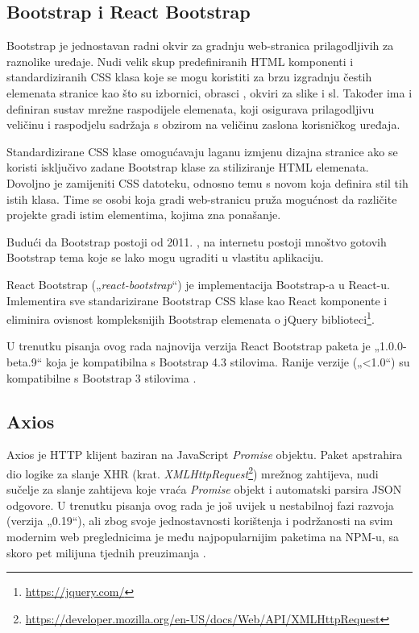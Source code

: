\documentclass[times, utf8, diplomski, numeric]{fer}
\newcommand{\razmakp}{\vspace{18pt}}
\newcommand{\razmaks}{\vspace{10pt}}
\begin{document}
\newpage
\subsection{Bootstrap i React Bootstrap}

Bootstrap je jednostavan radni okvir za gradnju web-stranica prilagodljivih za raznolike uređaje.
Nudi velik skup predefiniranih HTML komponenti i standardiziranih CSS klasa koje se mogu koristiti za brzu izgradnju čestih elemenata stranice kao što su izbornici, obrasci , okviri za slike i sl.
Također ima i definiran sustav mrežne raspodijele elemenata, koji osigurava prilagodljivu veličinu i raspodjelu sadržaja s obzirom na veličinu zaslona korisničkog uređaja.

Standardizirane CSS klase omogućavaju laganu izmjenu dizajna stranice ako se koristi isključivo zadane Bootstrap klase za stiliziranje HTML elemenata.
Dovoljno je zamijeniti CSS datoteku, odnosno temu s novom koja definira stil tih istih klasa.
Time se osobi koja gradi web-stranicu pruža mogućnost da različite projekte gradi istim elementima, kojima zna ponašanje.

Budući da Bootstrap postoji od 2011. \citep{wiki_bs}, na internetu postoji mnoštvo gotovih Bootstrap tema koje se lako mogu ugraditi u vlastitu aplikaciju.

\razmakp

React Bootstrap („\emph{react-bootstrap}“) je implementacija Bootstrap-a u React-u.
Imlementira sve standarizirane Bootstrap CSS klase kao React komponente i eliminira ovisnost kompleksnijih Bootstrap elemenata o jQuery biblioteci\footnote{\url{https://jquery.com/}}.

U trenutku pisanja ovog rada najnovija verzija React Bootstrap paketa je „1.0.0-beta.9“ koja je kompatibilna s Bootstrap 4.3 stilovima.
Ranije verzije („<1.0“) su kompatibilne s Bootstrap 3 stilovima \citep{bs_react}.


\razmaks
\subsection{Axios}

Axios je HTTP klijent baziran na JavaScript \emph{Promise} objektu.
Paket apstrahira dio logike za slanje XHR (krat. \emph{XMLHttpRequest}\footnote{\url{https://developer.mozilla.org/en-US/docs/Web/API/XMLHttpRequest}}) mrežnog zahtijeva, nudi sučelje za slanje zahtijeva koje vraća \emph{Promise} objekt i automatski parsira JSON odgovore.
U trenutku pisanja ovog rada je još uvijek u nestabilnoj fazi razvoja (verzija „0.19“), ali zbog svoje jednostavnosti korištenja i podržanosti na svim modernim web preglednicima je među najpopularnijim paketima na NPM-u, sa skoro pet milijuna tjednih preuzimanja \citep{axios}.
\end{document}
